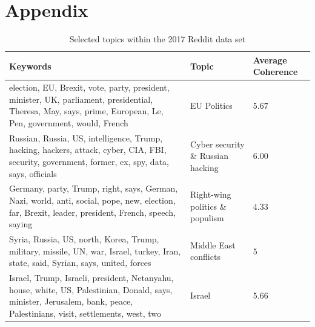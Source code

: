 \documentclass[final]{ieee}
\begin{document}
\thispagestyle{empty}

\onecolumn

\section*{Appendix}

\begin{table}[htb]
\caption{Selected topics within the 2017 Reddit data set}
\begin{tabularx}{\textwidth}{X|l|l}
Keywords & Topic & Average Coherence \\ \hline
election, EU, Brexit, vote, party, president, minister, UK, parliament, presidential, Theresa, May, says, prime, European, Le, Pen, government, would, French & EU Politics & $5.67$ \\ \hline
Russian, Russia, US, intelligence, Trump, hacking, hackers, attack, cyber, CIA, FBI, security, government, former, ex, spy, data, says, officials & Cyber security \& Russian hacking & $6.00$ \\ \hline
Germany, party, Trump, right, says, German, Nazi, world, anti, social, pope, new, election, far, Brexit, leader, president, French, speech, saying & Right-wing politics \& populism & $4.33$ \\ \hline
Syria, Russia, US, north, Korea, Trump, military, missile, UN, war, Israel, turkey, Iran, state, said, Syrian, says, united, forces & Middle East conflicts & $5$ \\ \hline
Israel, Trump, Israeli, president, Netanyahu, house, white, US, Palestinian, Donald, says, minister, Jerusalem, bank, peace, Palestinians, visit, settlements, west, two & Israel & $5.66$ \\
\end{tabularx}
\label{tab:topics}
\end{table}

\end{document}
